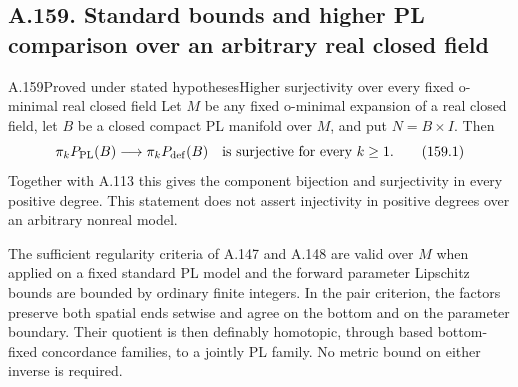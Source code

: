 \subsection{A.159. Standard bounds and higher PL comparison over an arbitrary real closed field}

\begin{saresult}{A.159}{Proved under stated hypotheses}{Higher surjectivity over every fixed o-minimal real closed field}
Let $M$ be any fixed o-minimal expansion of a real closed field,
let $B$ be a closed compact PL manifold over $M$, and put
$N=B\times I$. Then
\[
 \pi_k P_{\mathrm{PL}}(B)\longrightarrow
 \pi_k P_{\mathrm{def}}(B)
 \quad\hbox{is surjective for every }k\geq1.
 \tag{159.1}
\]
Together with A.113 this gives the component bijection and
surjectivity in every positive degree. This statement does not
assert injectivity in positive degrees over an arbitrary
nonreal model.

The sufficient regularity criteria of A.147 and A.148 are valid
over $M$ when applied on a fixed standard PL model and the
forward parameter Lipschitz bounds are bounded by ordinary
finite integers. In the pair criterion, the factors preserve
both spatial ends setwise and agree on the bottom and on the
parameter boundary. Their quotient is then definably homotopic,
through based bottom-fixed concordance families, to a jointly
PL family. No metric bound on either inverse is required.
\end{saresult}

